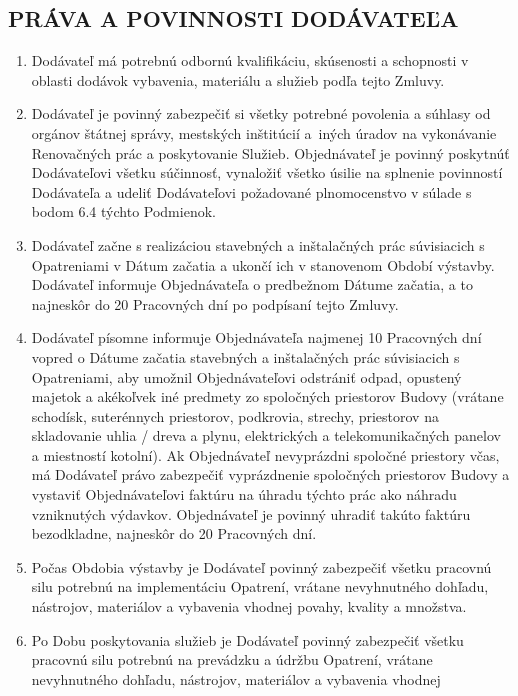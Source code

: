 \begin{multicols}{2}
\subsection{PRÁVA A POVINNOSTI DODÁVATEĽA}

\begin{enumerate}
\def\labelenumi{\arabic{enumi}.}
\item
  Dodávateľ má potrebnú odbornú kvalifikáciu, skúsenosti a schopnosti v
  oblasti dodávok vybavenia, materiálu a služieb podľa tejto Zmluvy.
\item
  Dodávateľ je povinný zabezpečiť si všetky potrebné povolenia a súhlasy
  od orgánov štátnej správy, mestských inštitúcií a~iných úradov na
  vykonávanie Renovačných prác a poskytovanie Služieb. Objednávateľ je
  povinný poskytnúť Dodávateľovi všetku súčinnosť, vynaložiť všetko
  úsilie na splnenie povinností Dodávateľa a udeliť Dodávateľovi
  požadované plnomocenstvo v súlade s bodom 6.4 týchto Podmienok.
\item
  Dodávateľ začne s realizáciou stavebných a inštalačných prác
  súvisiacich s Opatreniami v Dátum začatia a ukončí ich v stanovenom
  Období výstavby. Dodávateľ informuje Objednávateľa o predbežnom Dátume
  začatia, a to najneskôr do 20 Pracovných dní po podpísaní tejto
  Zmluvy.
\item
  Dodávateľ písomne informuje Objednávateľa najmenej 10 Pracovných dní
  vopred o Dátume začatia stavebných a inštalačných prác súvisiacich s
  Opatreniami, aby umožnil Objednávateľovi odstrániť odpad, opustený
  majetok a akékoľvek iné predmety zo spoločných priestorov Budovy
  (vrátane schodísk, suterénnych priestorov, podkrovia, strechy,
  priestorov na skladovanie uhlia / dreva a plynu, elektrických a
  telekomunikačných panelov a miestností kotolní). Ak Objednávateľ
  nevyprázdni spoločné priestory včas, má Dodávateľ právo zabezpečiť
  vyprázdnenie spoločných priestorov Budovy a vystaviť Objednávateľovi
  faktúru na úhradu týchto prác ako náhradu vzniknutých výdavkov.
  Objednávateľ je povinný uhradiť takúto faktúru bezodkladne, najneskôr
  do 20 Pracovných dní.
\item
  Počas Obdobia výstavby je Dodávateľ povinný zabezpečiť všetku pracovnú
  silu potrebnú na implementáciu Opatrení, vrátane nevyhnutného dohľadu,
  nástrojov, materiálov a vybavenia vhodnej povahy, kvality a množstva.
\item
  Po Dobu poskytovania služieb je Dodávateľ povinný zabezpečiť všetku
  pracovnú silu potrebnú na prevádzku a údržbu Opatrení, vrátane
  nevyhnutného dohľadu, nástrojov, materiálov a vybavenia vhodnej

\end{enumerate}
\end{multicols}

